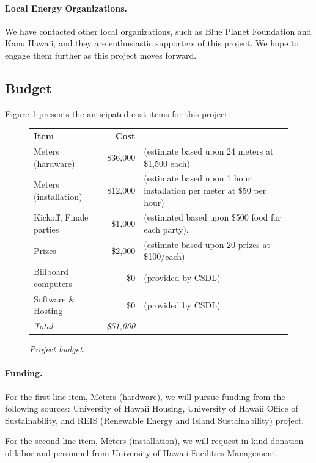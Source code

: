\documentclass[11pt]{article}
\begin{document}
\paragraph{Local Energy Organizations.}  We have contacted other local
organizations, such as Blue Planet Foundation and Kanu Hawaii, and they are
enthusiastic supporters of this project.  We hope to engage them further as
this project moves forward.


\subsection{Budget}
\label{sec:budget}

Figure \ref{fig:budget} presents the anticipated cost items for this project:

\begin{figure}[!ht]
\small
\begin{tabular}{lrl} \hline
{\bf Item }              & {\bf Cost }  & \\ 
Meters (hardware)      & \$36,000 & (estimate based upon 24 meters at \$1,500 each) \\
Meters (installation)    & \$12,000 & (estimate based upon 1 hour installation per meter at \$50 per hour) \\
Kickoff, Finale parties & \$1,000 & (estimated based upon \$500 food for each party). \\ 
Prizes                          & \$2,000  & (estimate based upon 20 prizes at \$100/each) \\ 
Billboard computers  & \$0 & (provided by CSDL) \\
Software  \& Hosting  & \$0 & (provided by CSDL) \\ \hline
{\em Total}                 &  {\em \$51,000} & \\ \hline      
\end{tabular} 
\normalsize
\caption{{\em Project budget.}}
\label{fig:budget}
\end{figure}

\paragraph{Funding.}  For the first line item, Meters (hardware), we will
pursue funding from the following sources: University of Hawaii Housing,
University of Hawaii Office of Sustainability, and REIS (Renewable Energy
and Island Sustainability) project.

For the second line item, Meters (installation), we will request in-kind donation 
of labor and personnel from  University of Hawaii Facilities Management.
\end{document}
